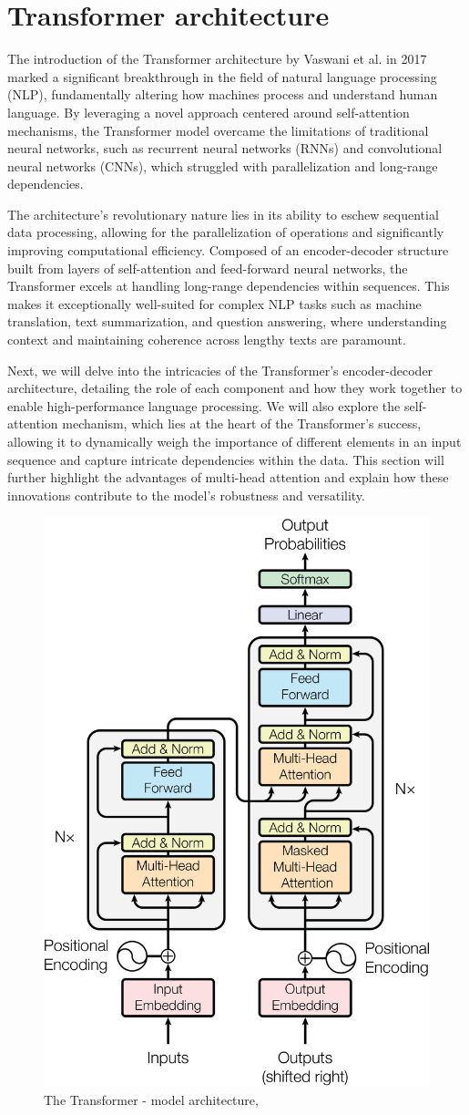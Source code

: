 \section{Transformer architecture}

The introduction of the Transformer architecture by Vaswani et al. in 2017 marked a significant breakthrough in the field of natural language processing (NLP), fundamentally altering how machines process and understand human language. By leveraging a novel approach centered around self-attention mechanisms, the Transformer model overcame the limitations of traditional neural networks, such as recurrent neural networks (RNNs) and convolutional neural networks (CNNs), which struggled with parallelization and long-range dependencies.

The architecture's revolutionary nature lies in its ability to eschew sequential data processing, allowing for the parallelization of operations and significantly improving computational efficiency. Composed of an encoder-decoder structure built from layers of self-attention and feed-forward neural networks, the Transformer excels at handling long-range dependencies within sequences. This makes it exceptionally well-suited for complex NLP tasks such as machine translation, text summarization, and question answering, where understanding context and maintaining coherence across lengthy texts are paramount.

Next, we will delve into the intricacies of the Transformer's encoder-decoder architecture, detailing the role of each component and how they work together to enable high-performance language processing. We will also explore the self-attention mechanism, which lies at the heart of the Transformer's success, allowing it to dynamically weigh the importance of different elements in an input sequence and capture intricate dependencies within the data. This section will further highlight the advantages of multi-head attention and explain how these innovations contribute to the model's robustness and versatility.


\begin{figure}[htbp]
    \centering
    \includegraphics[width=6 cm]{3_ChapterTranformerVariants/figuras/Transformer_architecture.png}
    \caption{The Transformer - model architecture, }
    \end{figure}

